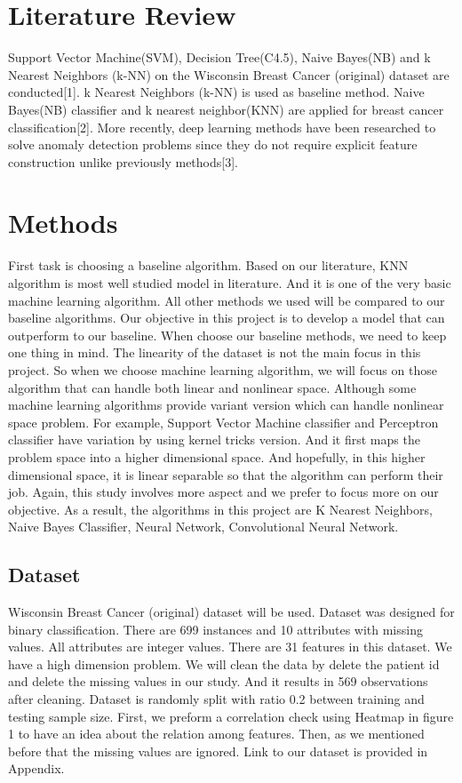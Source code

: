 \documentclass{article} %
\begin{document}
\section{Literature Review}
Support Vector Machine(SVM), Decision Tree(C4.5), Naive Bayes(NB) and k Nearest Neighbors (k-NN) on the Wisconsin Breast Cancer (original) dataset are conducted[1]. k Nearest Neighbors (k-NN) is used as baseline method. Naive Bayes(NB) classifier and k nearest neighbor(KNN) are applied for breast cancer classification[2]. More recently, deep learning methods have been researched to solve anomaly detection problems since they do not require explicit feature construction unlike previously methods[3].

\section{Methods}

First task is choosing a baseline algorithm. Based on our literature, KNN algorithm is most well studied model in literature. And it is one of the very basic machine learning algorithm. All other methods we used will be compared to our baseline algorithms. Our objective in this project is to develop a model that can outperform to our baseline. When choose our baseline methods, we need to keep one thing in mind. The linearity of the dataset is not the main focus in this project. So when we choose machine learning algorithm, we will focus on those algorithm that can handle both linear and nonlinear space. Although some machine learning algorithms provide variant version which can handle nonlinear space problem. For example, Support Vector Machine classifier and Perceptron classifier have variation by using kernel tricks version. And it first maps the problem space into a higher dimensional space. And hopefully, in this higher dimensional space, it is linear separable so that the algorithm can perform their job. Again, this study involves more aspect and we prefer to focus more on our objective. As a result, the algorithms in this project are K Nearest Neighbors, Naive Bayes Classifier, Neural Network, Convolutional Neural Network. 

\subsection{Dataset}
Wisconsin Breast Cancer (original) dataset will be used. Dataset was designed for binary classification. There are 699 instances and 10 attributes with missing values. All attributes are integer values. There are 31 features in this dataset. We have a high dimension problem. We will clean the data by delete the patient id and delete the missing values in our study. And it results in 569 observations after cleaning. Dataset is randomly split with ratio 0.2 between training and testing sample size. First, we preform a correlation check using Heatmap in figure 1 to have an idea about the relation among features. Then, as we mentioned before that the missing values are ignored. Link to our dataset is provided in Appendix. 
\end{document}
